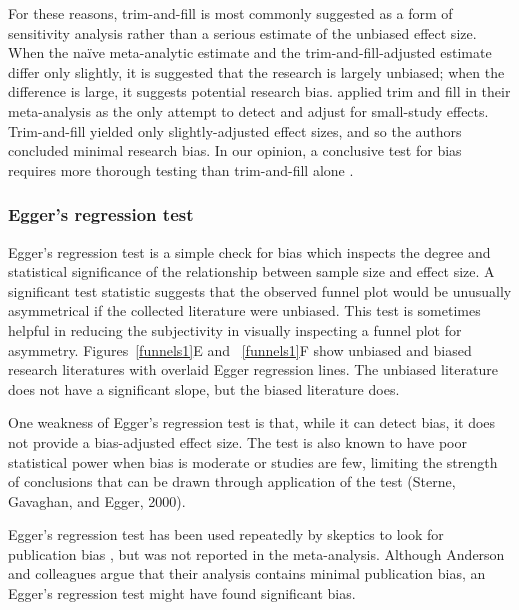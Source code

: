 \documentclass[man]{apa6}
\begin{document}
For these reasons, trim-and-fill is most commonly suggested as a form of sensitivity analysis rather than a serious estimate of the unbiased effect size. When the na{\"i}ve meta-analytic estimate and the trim-and-fill-adjusted estimate differ only slightly, it is suggested that the research is largely unbiased; when the difference is large, it suggests potential research bias.
\citet{Anderson:etal:2010} applied trim and fill in their meta-analysis as the only attempt to detect and adjust for small-study effects. Trim-and-fill yielded only slightly-adjusted effect sizes, and so the authors concluded minimal research bias.  %
In our opinion, a conclusive test for bias requires more thorough testing than trim-and-fill alone \citep[c.f.,][]{Bushman:Huesmann:2014}.

\subsubsection{Egger's regression test}
Egger's regression test \citep{Egger:1997} is a simple check for bias which inspects the degree and statistical significance of the relationship between sample size and effect size. A significant test statistic suggests that the observed funnel plot would be unusually asymmetrical if the collected literature were unbiased. This test is sometimes helpful in reducing the subjectivity in visually inspecting a funnel plot for asymmetry. Figures~\ref{funnels1}E and ~\ref{funnels1}F show unbiased and biased research literatures with overlaid Egger regression lines. The unbiased literature does not have a significant slope, but the biased literature does. 

One weakness of Egger's regression test is that, while it can detect bias, it does not provide a bias-adjusted effect size. The test is also known to have poor statistical power when bias is moderate or studies are few, limiting the strength of conclusions that can be drawn through application of the test (Sterne, Gavaghan, and Egger, 2000).

Egger's regression test has been used repeatedly by skeptics to look for publication bias \citep[e.g.,][]{Ferguson:2007,Ferguson:Kilburn:2009}, but was not reported in the \citet{Anderson:etal:2010} meta-analysis. Although Anderson and colleagues argue that their analysis contains minimal publication bias, an Egger's regression test might have found significant bias.
\end{document}
